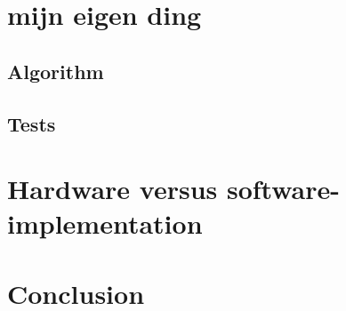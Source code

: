 \section{mijn eigen ding}
\subsection{Algorithm}

\subsection{Tests}

\section{Hardware versus software-implementation}

\section{Conclusion}
